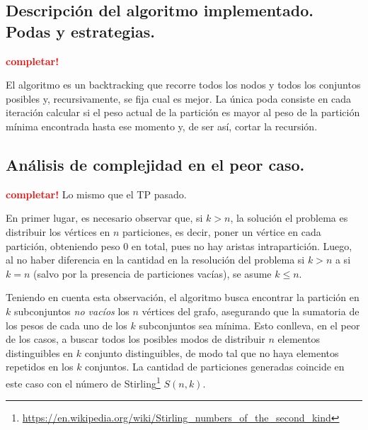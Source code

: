 \subsection{Descripción del algoritmo implementado. Podas y estrategias.}
\vspace*{0.3cm}

\textcolor{red}{\textbf{completar!}}

El algoritmo es un backtracking que recorre todos los nodos y todos los
conjuntos posibles y, recursivamente, se fija cual es mejor.  La única poda
consiste en cada iteración calcular si el peso actual de la partición es mayor
al peso de la partición mínima encontrada hasta ese momento y, de ser así,
cortar la recursión.


\newpage

\subsection{Análisis de complejidad en el peor caso.}
\vspace*{0.3cm}

\textcolor{red}{\textbf{completar!}} Lo mismo que el TP pasado.


En primer lugar, es necesario observar que, si $k > n$, la solución el problema
es distribuir los vértices en $n$ particiones, es decir, poner un vértice en
cada partición, obteniendo peso $0$ en total, pues no hay aristas
intrapartición. Luego, al no haber diferencia en la cantidad en la resolución
del problema si $k > n$ a si $k = n$ (salvo por la presencia de particiones
vacías), se asume $k \le n$.

Teniendo en cuenta esta observación, el algoritmo busca encontrar la
partición en $k$ subconjuntos \textit{no vacíos} los $n$ vértices del grafo,
asegurando que la sumatoria de los pesos de cada uno de los $k$ subconjuntos
sea mínima. Esto conlleva, en el peor de los casos, a buscar todos los posibles
modos de distribuir $n$ elementos distinguibles en $k$ conjunto distinguibles,
de modo tal que no haya elementos repetidos en los $k$ conjuntos. La cantidad
de particiones generadas coincide en este caso con el número de
Stirling\footnote{
\url{https://en.wikipedia.org/wiki/Stirling_numbers_of_the_second_kind}} $S(n,
k)$.

